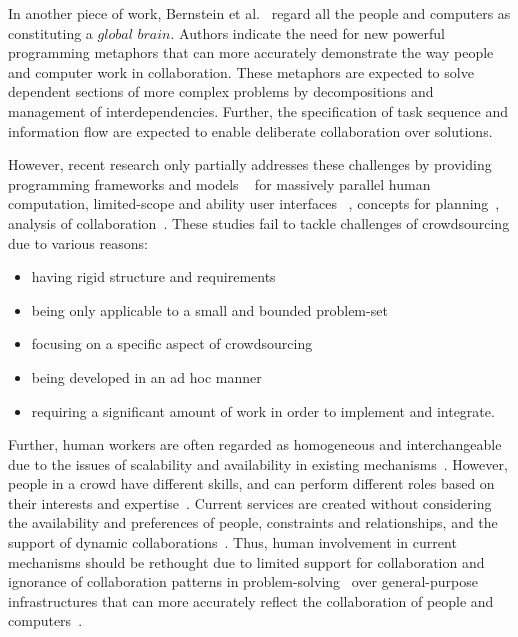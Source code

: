 In another piece of work, Bernstein et al.~\cite{Bernstein2012} regard all the 
people and computers as constituting a $global$ $brain$. Authors indicate the 
need for new powerful programming metaphors that can more accurately 
demonstrate the way people and computer work in collaboration. These 
metaphors are expected to solve dependent sections of more complex problems by 
decompositions and management of interdependencies. Further, the specification 
of task sequence and information flow are expected to enable deliberate 
collaboration over solutions.

However, recent research only partially addresses these challenges by 
providing programming frameworks and models
~\cite{Kittur2011, Ahmad2011, Kokciyan2012, Little2009, Minder2011, Barowy2012, Kulkarni2012, Kittur2012} 
for massively parallel human computation, limited-scope and ability user interfaces
~\cite{Marcus2011, Bernstein2010, Marcus2011b, Rzeszotarski2012}, 
concepts for planning~\cite{Zhang2012}, 
analysis of collaboration~\cite{Dorn2012}. 
These studies fail to tackle challenges of crowdsourcing due to various reasons:
\begin{itemize}
	\item having rigid structure and requirements
	\item being only applicable to a small and bounded problem-set
	\item focusing on a specific aspect of crowdsourcing
	\item being developed in an ad hoc manner
	\item requiring a significant amount of work in order to implement and integrate.
\end{itemize}


Further, human workers are often regarded as homogeneous and 
interchangeable due to the issues of scalability and availability in existing 
mechanisms~\cite{Ahmad2011}. However, people in a crowd have different 
skills, and can perform different roles based on their interests and expertise~\cite{Zhang2011}. 
Current services are created without considering the availability and preferences of 
people, constraints and relationships, and the support of dynamic 
collaborations~\cite{Schall2010}. Thus, human involvement in current mechanisms should 
be rethought due to limited support for collaboration and 
ignorance of collaboration patterns in problem-solving~\cite{Dorn2012a} 
over general-purpose infrastructures that can more accurately reflect 
the collaboration of people and computers~\cite{Bernstein2012, Minder2012}.

